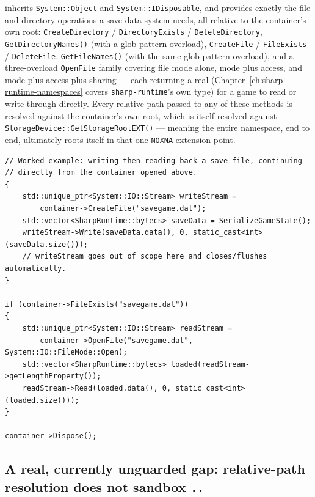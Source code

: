  inherits \texttt{System::Object} and \texttt{System::IDisposable},
and provides exactly the file and directory operations a save-data system needs, all relative
to the container's own root: \texttt{CreateDirectory} / \texttt{DirectoryExists} /
\texttt{DeleteDirectory}, \texttt{GetDirectoryNames()} (with a glob-pattern overload),
\texttt{CreateFile} / \texttt{FileExists} / \texttt{DeleteFile}, \texttt{GetFileNames()} (with the
same glob-pattern overload), and a three-overload \texttt{OpenFile} family covering file mode
alone, mode plus access, and mode plus access plus sharing --- each returning a real
 (Chapter~\ref{ch:sharp-runtime-namespaces} covers \texttt{sharp-runtime}'s own 
type) for a game to read or write through directly. Every relative path
passed to any of these methods is resolved against the container's own root, which is itself
resolved against \texttt{StorageDevice::GetStorageRootEXT()} --- meaning the entire
namespace, end to end, ultimately roots itself in that one \texttt{NOXNA} extension point.

\begin{lstlisting}
// Worked example: writing then reading back a save file, continuing
// directly from the container opened above.
{
    std::unique_ptr<System::IO::Stream> writeStream =
        container->CreateFile("savegame.dat");
    std::vector<SharpRuntime::bytecs> saveData = SerializeGameState();
    writeStream->Write(saveData.data(), 0, static_cast<int>(saveData.size()));
    // writeStream goes out of scope here and closes/flushes automatically.
}

if (container->FileExists("savegame.dat"))
{
    std::unique_ptr<System::IO::Stream> readStream =
        container->OpenFile("savegame.dat", System::IO::FileMode::Open);
    std::vector<SharpRuntime::bytecs> loaded(readStream->getLengthProperty());
    readStream->Read(loaded.data(), 0, static_cast<int>(loaded.size()));
}

container->Dispose();
\end{lstlisting}

\subsection{A real, currently unguarded gap: relative-path resolution does not sandbox \texttt{..}}

